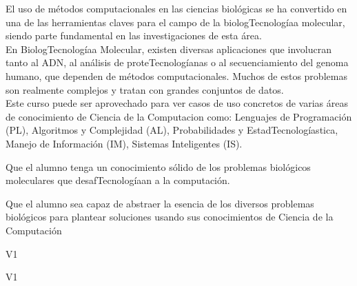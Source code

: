 \begin{syllabus}


\begin{justification}
El uso de métodos computacionales en las ciencias biológicas se ha convertido en una de las herramientas claves para el campo de la biologTecnologíaa molecular, siendo parte fundamental en las investigaciones de esta área. 
\\
En BiologTecnologíaa Molecular, existen diversas aplicaciones que involucran tanto al ADN, al análisis de proteTecnologíanas o al secuenciamiento del genoma humano, que dependen de métodos computacionales. Muchos de estos problemas son realmente complejos y tratan con grandes conjuntos de datos. 
\\
Este curso puede ser aprovechado para ver casos de uso concretos de varias áreas de conocimiento de Ciencia de la Computacion como: Lenguajes de Programación (PL), Algoritmos y Complejidad (AL), Probabilidades y EstadTecnologíastica, Manejo de Información (IM), Sistemas Inteligentes (IS).
\end{justification}

\begin{goals}
\item Que el alumno tenga un conocimiento sólido de los problemas biológicos moleculares que desafTecnologíaan a la computación.
\item Que el alumno sea capaz de abstraer la esencia de los diversos problemas biológicos para plantear soluciones usando sus conocimientos de Ciencia de la Computación
\end{goals}

\begin{outcomes}{V1}
    \item {}
    \item {}
    \item {}
\end{outcomes}

\begin{competences}{V1}
    \item {} 
    \item {}
    \item {}
\end{competences}


\end{syllabus}
